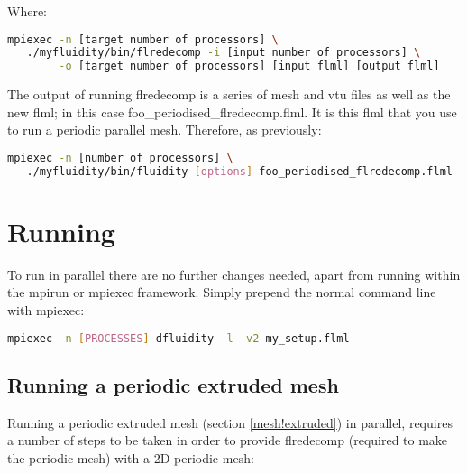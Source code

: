 Where:

\begin{lstlisting}[language=bash]
mpiexec -n [target number of processors] \
   ./myfluidity/bin/flredecomp -i [input number of processors] \
        -o [target number of processors] [input flml] [output flml]
\end{lstlisting}

The output of running flredecomp is a series of mesh and vtu files as well as the new flml; in this case foo\_periodised\_flredecomp.flml. It is this flml that you use to run a periodic parallel mesh. Therefore, as previously:

\begin{lstlisting}[language=bash]
mpiexec -n [number of processors] \
   ./myfluidity/bin/fluidity [options] foo_periodised_flredecomp.flml
\end{lstlisting}

\section{Running}

To run in parallel there are no further changes needed, apart from running \fluidity
within the mpirun or mpiexec framework. Simply prepend the normal command line with mpiexec:
\begin{lstlisting}[language=bash]
mpiexec -n [PROCESSES] dfluidity -l -v2 my_setup.flml
\end{lstlisting}

\subsection{Running a periodic extruded mesh}

Running a periodic extruded mesh (section \ref{mesh!extruded}) in parallel, requires a number of steps to be taken in order to provide flredecomp (required to make the periodic mesh) with a 2D periodic mesh:

